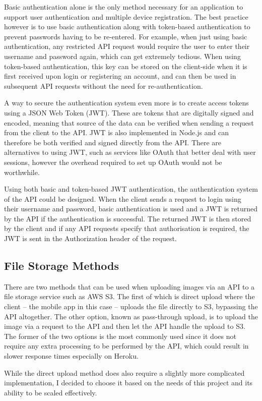 Basic authentication alone is the only method necessary for an application to support user authentication and multiple device registration. The best practice however is to use basic authentication along with token-based authentication to prevent passwords having to be re-entered. For example, when just using basic authentication, any restricted API request would require the user to enter their username and password again, which can get extremely tedious. When using token-based authentication, this key can be stored on the client-side when it is first received upon login or registering an account, and can then be used in subsequent API requests without the need for re-authentication.

A way to secure the authentication system even more is to create access tokens using a JSON Web Token (JWT). These are tokens that are digitally signed and encoded, meaning that source of the data can be verified when sending a request from the client to the API. JWT is also implemented in Node.js and can therefore be both verified and signed directly from the API. There are alternatives to using JWT, such as services like OAuth that better deal with user sessions, however the overhead required to set up OAuth would not be worthwhile.

Using both basic and token-based JWT authentication, the authentication system of the API could be designed. When the client sends a request to login using their username and password, basic authentication is used and a JWT is returned by the API if the authentication is successful. The returned JWT is then stored by the client and if any API requests specify that authorisation is required, the JWT is sent in the Authorization header of the request.
 
\subsection{File Storage Methods} \label{subsection:file-storage-methods}

There are two methods that can be used when uploading images via an API to a file storage service such as AWS S3. The first of which is direct upload where the client -- the mobile app in this case -- uploads the file directly to S3, bypassing the API altogether. The other option, known as pass-through upload, is to upload the image via a request to the API and then let the API handle the upload to S3. The former of the two options is the most commonly used since it does not require any extra processing to be performed by the API, which could result in slower response times especially on Heroku.

While the direct upload method does also require a slightly more complicated implementation, I decided to choose it based on the needs of this project and its ability to be scaled effectively.
